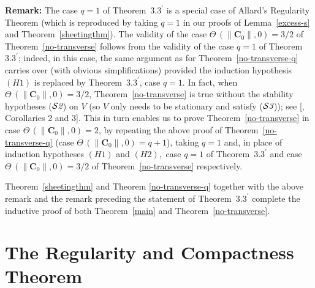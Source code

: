 \documentclass[a4paper,11pt]{amsart}
\begin{document}
\noindent
{\bf Remark:} The case $q=1$ of Theorem~$3.3^{\prime}$  is a special case of Allard's Regularity Theorem (which is reproduced by taking $q=1$ in our proofs of Lemma~\ref{excess-s} and Theorem~\ref{sheetingthm}). The validity of the case $\Theta \, (\|{\mathbf C}_{0}\|, 0) = 3/2$ of Theorem~\ref{no-transverse} follows from the validity of the case $q=1$ of Theorem~$3.3^{\prime}$; indeed, in this case, the same argument as for Theorem~\ref{no-transverse-q} carries over (with obvious simplifications) provided the induction hypothesis $(H1)$ is replaced by Theorem~$3.3^{\prime}$, case $q=1.$ In fact, when $\Theta \, (\|{\mathbf C}_{0}\|, 0) = 3/2$, Theorem~\ref{no-transverse} is true without the stability hypotheses (${\mathcal S{\emph2}}$) on $V$ (so $V$ only needs to be stationary and satisfy (${\mathcal S{\emph3}}$)); see [\cite{S}, Corollaries 2 and 3].
This in turn enables us to prove Theorem~\ref{no-transverse} in case $\Theta \, (\|{\mathbf C}_{0}\|, 0) = 2$, by
repeating the above proof of Theorem~\ref{no-transverse-q} (case $\Theta \,(\|{\mathbf C}_{0}\|, 0) = q +1$), taking 
$q= 1$ and, in place of induction hypotheses $(H1)$ and $(H2),$ case $q=1$ of Theorem~$3.3^{\prime}$ and  
case $\Theta \, (\|{\mathbf C}_{0}\|, 0) = 3/2$ of Theorem~\ref{no-transverse} respectively.


Theorem~\ref{sheetingthm} and Theorem \ref{no-transverse-q} together with the above remark and the remark preceding the statement of Theorem~$3.3^{\prime}$ complete the inductive proof of both Theorem~\ref{main} and Theorem~\ref{no-transverse}.



\section{The Regularity and Compactness Theorem}\label{reg-compactness}
\setcounter{equation}{0}
\end{document}
